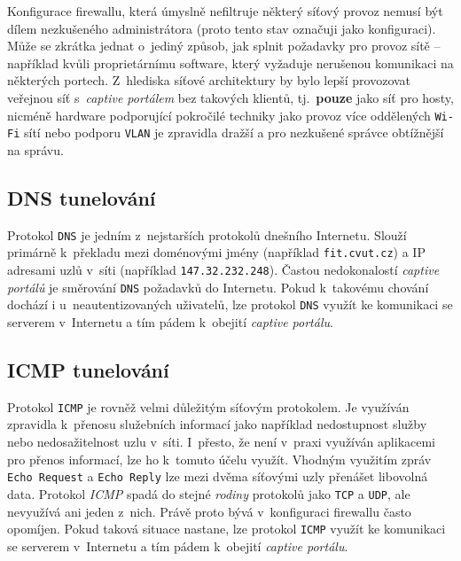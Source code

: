\documentclass[thesis=M,czech]{FITthesis}[2012/10/20]
\begin{document}
Konfigurace firewallu, která úmyslně nefiltruje některý síťový provoz nemusí být dílem nezkušeného administrátora (proto tento stav označuji jako \textbf{} konfiguraci). Může se zkrátka jednat o~jediný způsob, jak splnit požadavky pro provoz sítě -- například kvůli proprietárnímu software, který vyžaduje nerušenou komunikaci na některých portech. Z~hlediska síťové architektury by bylo lepší provozovat veřejnou síť s~\textit{captive portálem} bez takových klientů, tj.~\textbf{pouze} jako síť pro hosty, nicméně hardware podporující pokročilé techniky jako provoz více oddělených \texttt{Wi-Fi} sítí nebo podporu \texttt{VLAN} je zpravidla dražší a pro nezkušené správce obtížnější na správu.


\subsection{DNS tunelování}
\label{subsec:dns-tunel-intro}

Protokol \texttt{DNS} je jedním z~nejstarších protokolů dnešního Internetu. Slouží primárně k~překladu mezi doménovými jmény (například \texttt{fit.cvut.cz}) a IP adresami uzlů v~síti (například \texttt{147.32.232.248}). Častou nedokonalostí \textit{captive portálů} je směrování \texttt{DNS} požadavků do Internetu. Pokud k~takovému chování dochází i u~neautentizovaných uživatelů, lze protokol \texttt{DNS} využít ke komunikaci se serverem v~Internetu a tím pádem k~obejití \textit{captive portálu}.



\subsection{ICMP tunelování}

Protokol \texttt{ICMP} je rovněž velmi důležitým síťovým protokolem. Je využíván zpravidla k~přenosu služebních informací jako například nedostupnost služby nebo nedosažitelnost uzlu v~síti. I~přesto, že není v~praxi využíván aplikacemi pro přenos informací, lze ho k~tomuto účelu využít. Vhodným využitím zpráv \texttt{Echo Request} a \texttt{Echo Reply} lze mezi dvěma síťovými uzly přenášet libovolná data. Protokol \textit{ICMP} spadá do stejné \textit{rodiny} protokolů jako \texttt{TCP} a \texttt{UDP}, ale nevyužívá ani jeden z~nich. Právě proto bývá v~konfiguraci firewallu často opomíjen. Pokud taková situace nastane, lze protokol \texttt{ICMP} využít ke komunikaci se serverem v~Internetu a tím pádem k~obejití \textit{captive portálu}.
\end{document}
